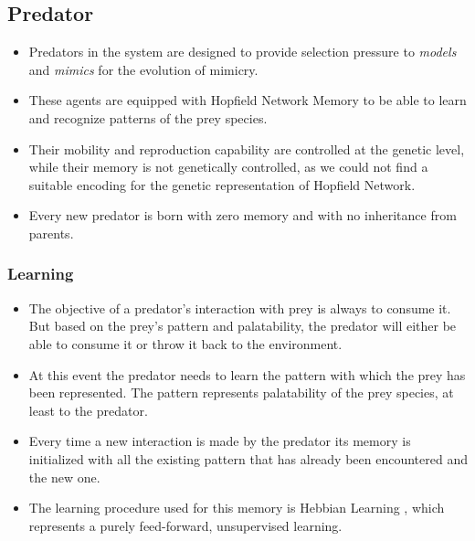 \documentclass[a0,landscape]{a0poster}
\begin{document}
\begin{multicols}{5}
\color{SaddleBrown} 
\subsection*{Predator}

\begin{itemize}
	\item Predators in the system are designed to provide selection pressure to \textit{models} and \textit{mimics} for the evolution of mimicry. 
	\item These agents are equipped with Hopfield Network Memory to be able to learn and recognize patterns of the prey species.
	\item Their mobility and reproduction capability are controlled at the genetic level, while their memory is not genetically controlled, as we could not find a suitable encoding for the genetic representation of Hopfield Network.
	\item Every new predator is born with zero memory and with no inheritance from parents.
\end{itemize}

\color{DarkSlateGray}
\subsubsection*{Learning}

\begin{itemize}
	\item The objective of a predator's interaction with prey is always to consume it. But based on the prey's pattern and palatability, the predator will either be able to consume it or throw it back to the environment. 
	\item At this event the predator needs to learn the pattern with which the prey has been represented. The pattern represents palatability of the prey species, at least to the predator. 
	\item Every time a new interaction is made by the predator its memory is initialized with all the existing pattern that has already been encountered and the new one.
	\item The learning procedure used for this memory is Hebbian Learning \citep{hebb1949}, which represents a purely feed-forward, unsupervised learning. 
\end{itemize}


\end{multicols}
\end{document}
